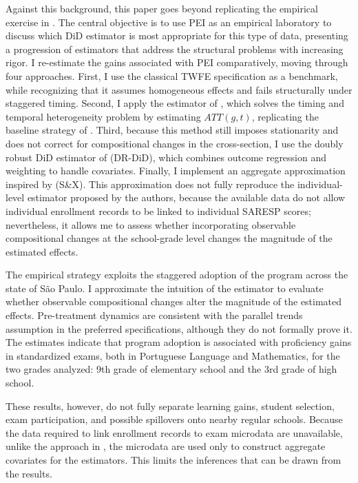 Against this background, this paper goes beyond replicating the empirical exercise in \textcite{scorzafave2023}. The central objective is to use PEI as an empirical laboratory to discuss which DiD estimator is most appropriate for this type of data, presenting a progression of estimators that address the structural problems with increasing rigor. I re-estimate the gains associated with PEI comparatively, moving through four approaches. First, I use the classical TWFE specification as a benchmark, while recognizing that it assumes homogeneous effects and fails structurally under staggered timing. Second, I apply the estimator of \textcite{callawaysantanna}, which solves the timing and temporal heterogeneity problem by estimating $ATT(g,t)$, replicating the baseline strategy of \textcite{scorzafave2023}. Third, because this method still imposes stationarity and does not correct for compositional changes in the cross-section, I use the doubly robust DiD estimator of \textcite{santannazhao} (DR-DiD), which combines outcome regression and weighting to handle covariates. Finally, I implement an aggregate approximation inspired by \textcite{santannaxu} (S\&X). This approximation does not fully reproduce the individual-level estimator proposed by the authors, because the available data do not allow individual enrollment records to be linked to individual SARESP scores; nevertheless, it allows me to assess whether incorporating observable compositional changes at the school-grade level changes the magnitude of the estimated effects.

The empirical strategy exploits the staggered adoption of the program across the state of São Paulo. I approximate the intuition of the \textcite{santannaxu} estimator to evaluate whether observable compositional changes alter the magnitude of the estimated effects. Pre-treatment dynamics are consistent with the parallel trends assumption in the preferred specifications, although they do not formally prove it. The estimates indicate that program adoption is associated with proficiency gains in standardized exams, both in Portuguese Language and Mathematics, for the two grades analyzed: 9th grade of elementary school and the 3rd grade of high school.

These results, however, do not fully separate learning gains, student selection, exam participation, and possible spillovers onto nearby regular schools. Because the data required to link enrollment records to exam microdata are unavailable, unlike the approach in \textcite{scorzafave2023}, the microdata are used only to construct aggregate covariates for the estimators. This limits the inferences that can be drawn from the results.

